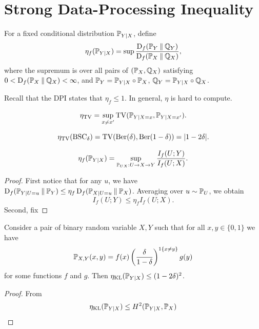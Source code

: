 \section{Strong Data-Processing Inequality}

\begin{definition}
    For a fixed conditional distribution $\mathbb{P}_{Y|X}$, define
    \[\eta_f(\mathbb{P}_{Y|X})=\sup\frac{\operatorname{D}_f(\mathbb{P}_Y\mathbin{\|}\mathbb{Q}_Y)}{\operatorname{D}_f(\mathbb{P}_X\mathbin{\|}\mathbb{Q}_X)},\]
    where the supremum is over all pairs of $(\mathbb{P}_X,\mathbb{Q}_X)$ satisfying $0<\operatorname{D}_f(\mathbb{P}_X\mathbin{\|}\mathbb{Q}_X)<\infty$, and $\mathbb{P}_Y=\mathbb{P}_{Y|X}\circ \mathbb{P}_X$, $\mathbb{Q}_Y=\mathbb{P}_{Y|X}\circ\mathbb{Q}_X$.
\end{definition}
Recall that the DPI states that $\eta_f\leq 1$.
In general, $\eta$ is hard to compute.
\begin{theorem}
    \[\eta_{\operatorname{TV}}=\sup_{x\neq x'}\operatorname{TV}(\mathbb{P}_{Y|X=x},\mathbb{P}_{Y|X=x'}).\]
\end{theorem}
\begin{example}
    \[\eta_{\operatorname{TV}}(\operatorname{BSC}_\delta)=\operatorname{TV}(\operatorname{Ber}(\delta),\operatorname{Ber}(1-\delta))=|1-2\delta|.\]
\end{example}

\begin{theorem}
    \[\eta_f(\mathbb{P}_{Y|X})=\sup_{\mathbb{P}_{UX}:U\to X\to Y}\frac{I_f(U;Y)}{I_f(U;X)}.\]
\end{theorem}
\begin{proof}
    First notice that for any $u$, we have $\operatorname{D}_f(\mathbb{P}_{Y|U=u}\mathbin{\|}\mathbb{P}_Y)\leq \eta_f\operatorname{D}_f(\mathbb{P}_{X|U=u}\mathbin{\|} \mathbb{P}_X)$.
    Averaging over $u\sim\mathbb{P}_U$, we obtain 
    \[I_f(U;Y)\leq \eta_f I_f(U;X).\]
    Second, fix 
\end{proof}


\begin{example}
    
\end{example}

\begin{lemma}
    Consider a pair of binary random variable $X,Y$ such that for all $x,y\in\{0,1\}$ we have 
    \[\mathbb{P}_{X,Y}(x,y)=f(x)\left(\frac{\delta}{1-\delta}\right)^{1\{x\neq y\}}g(y)\]
    for some functions $f$ and $g$. Then $\eta_{\operatorname{KL}}(\mathbb{P}_{Y|X})\leq (1-2\delta)^2$.
\end{lemma}
\begin{proof}
    From 
    \[\eta_{\operatorname{KL}}(\mathbb{P}_{Y|X})\leq H^2(\mathbb{P}_{Y|X},\mathbb{P}_X)\]
\end{proof}

